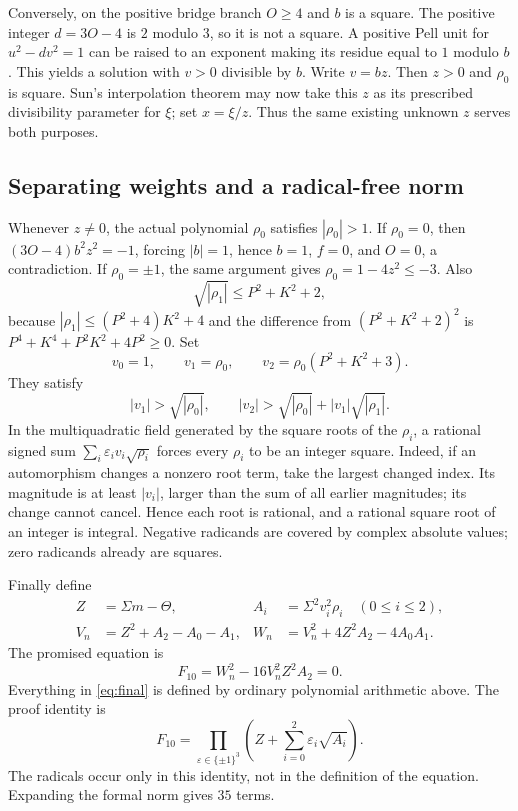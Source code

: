 \documentclass[11pt,a4paper]{article}
\theoremstyle{remark}
\begin{document}
Conversely, on the positive bridge branch \(O\ge4\) and \(b\) is a
square. The positive integer \(d=3O-4\) is \(2\) modulo \(3\), so
it is not a square. A positive Pell unit for
\(u^2-dv^2=1\) can be raised to an exponent making its residue
equal to \(1\) modulo \(b\). This yields a solution with \(v>0\)
divisible by \(b\). Write \(v=bz\). Then \(z>0\) and \(\rho_0\)
is square. Sun's interpolation theorem may now take this \(z\)
as its prescribed divisibility parameter for \(\xi\); set
\(x=\xi/z\). Thus the same existing unknown \(z\) serves both
purposes.

\subsection{Separating weights and a radical-free norm}
Whenever \(z\ne0\), the actual polynomial \(\rho_0\) satisfies
\(|\rho_0|>1\). If \(\rho_0=0\), then
\((3O-4)b^2z^2=-1\), forcing \(|b|=1\), hence \(b=1\), \(f=0\),
and \(O=0\), a contradiction. If \(\rho_0=\pm1\), the same
argument gives \(\rho_0=1-4z^2\le-3\).
Also
\[
\sqrt{|\rho_1|}\le P^2+K^2+2,
\]
because \(|\rho_1|\le(P^2+4)K^2+4\) and the difference from
\((P^2+K^2+2)^2\) is \(P^4+K^4+P^2K^2+4P^2\ge0\).
Set
\begin{equation}\label{eq:weights}
v_0=1,\qquad v_1=\rho_0,\qquad v_2=\rho_0(P^2+K^2+3).
\end{equation}
They satisfy
\[
|v_1|>\sqrt{|\rho_0|},\qquad
|v_2|>\sqrt{|\rho_0|}+|v_1|\sqrt{|\rho_1|}.
\]
In the multiquadratic field generated by the square roots of the
\(\rho_i\), a rational signed sum
\(\sum_i\varepsilon_i v_i\sqrt{\rho_i}\) forces every \(\rho_i\)
to be an integer square. Indeed, if an automorphism changes a
nonzero root term, take the largest changed index. Its magnitude
is at least \(|v_i|\), larger than the sum of all earlier
magnitudes; its change cannot cancel. Hence each root is rational,
and a rational square root of an integer is integral. Negative
radicands are covered by complex absolute values; zero radicands
already are squares.

Finally define
\begin{align}
Z&=\Sigma m-\Theta,&
A_i&=\Sigma^2v_i^2\rho_i\quad(0\le i\le2),\nonumber\\
V_n&=Z^2+A_2-A_0-A_1,&
W_n&=V_n^2+4Z^2A_2-4A_0A_1.\label{eq:normparts}
\end{align}
The promised equation is
\begin{equation}\label{eq:final}
\boxed{\qquad F_{10}=W_n^2-16V_n^2Z^2A_2=0.\qquad}
\end{equation}
Everything in \eqref{eq:final} is defined by ordinary polynomial
arithmetic above. The proof identity is
\[
F_{10}=\prod_{\varepsilon\in\{\pm1\}^3}
\left(Z+\sum_{i=0}^2\varepsilon_i\sqrt{A_i}\right).
\]
The radicals occur only in this identity, not in the definition of
the equation. Expanding the formal norm gives \(35\) terms.
\end{document}
